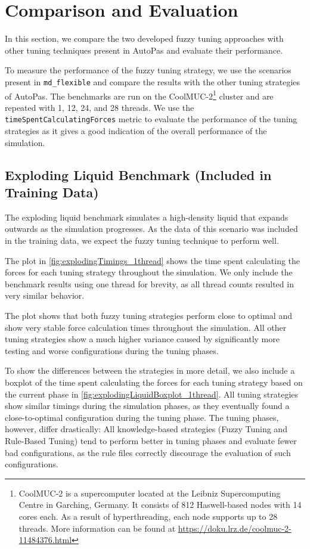 \chapter{Comparison and Evaluation}
\label{sec:comparison_and_evaluation}

In this section, we compare the two developed fuzzy tuning approaches with other tuning techniques present in AutoPas and evaluate their performance.

\medskip

\noindent To measure the performance of the fuzzy tuning strategy, we use the scenarios present in \texttt{md\_flexible} and compare the results with the other tuning strategies of AutoPas. The benchmarks are run on the CoolMUC-2\footnote{\label{CoolMucSpecs}CoolMUC-2 is a supercomputer located at the Leibniz Supercomputing Centre in Garching, Germany. It consists of 812 Haswell-based nodes with 14 cores each. As a result of hyperthreading, each node supports up to 28 threads. More information can be found at \url{https://doku.lrz.de/coolmuc-2-11484376.html}} cluster and are repeated with 1, 12, 24, and 28 threads. We use the \texttt{timeSpentCalculatingForces} metric to evaluate the performance of the tuning strategies as it gives a good indication of the overall performance of the simulation.


\section{Exploding Liquid Benchmark (Included in Training Data)}
\label{sec:explodingLiquidBenchmark}

The exploding liquid benchmark simulates a high-density liquid that expands outwards as the simulation progresses. As the data of this scenario was included in the training data, we expect the fuzzy tuning technique to perform well.

The plot in \autoref{fig:explodingTimings_1thread} shows the time spent calculating the forces for each tuning strategy throughout the simulation. We only include the benchmark results using one thread for brevity, as all thread counts resulted in very similar behavior.

The plot shows that both fuzzy tuning strategies perform close to optimal and show very stable force calculation times throughout the simulation. All other tuning strategies show a much higher variance caused by significantly more testing and worse configurations during the tuning phases.

To show the differences between the strategies in more detail, we also include a boxplot of the time spent calculating the forces for each tuning strategy based on the current phase in \autoref{fig:explodingLiquidBoxplot_1thread}. All tuning strategies show similar timings during the simulation phases, as they eventually found a close-to-optimal configuration during the tuning phase. The tuning phases, however, differ drastically: All knowledge-based strategies (Fuzzy Tuning and Rule-Based Tuning) tend to perform better in tuning phases and evaluate fewer bad configurations, as the rule files correctly discourage the evaluation of such configurations.

